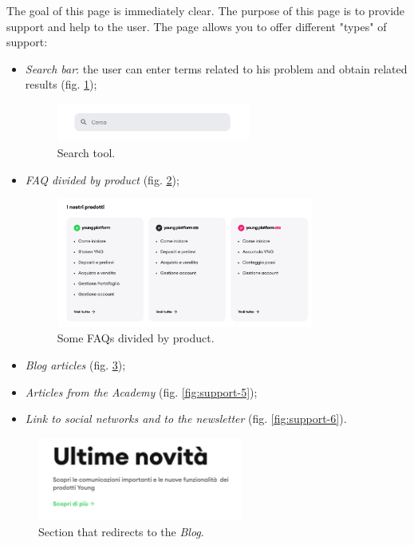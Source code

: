 The goal of this page is immediately clear. The purpose of this page is to 
provide support and help to the user. The page allows you to offer 
different "types" of support:
\begin{itemize}
  \item \textit{Search bar}: the user can enter terms related to his 
  problem and obtain related results (fig. \ref{fig:support-2});

  \begin{figure}[H]
    \centering
    \includegraphics[width=0.60\textwidth]{res/images/internal-pages/support/support-2.png}
    \caption{Search tool.}
    \label{fig:support-2}
  \end{figure}
  
  \item \textit{FAQ divided by product} (fig. \ref{fig:support-3});
  
  \begin{figure}[H]
    \centering
    \includegraphics[width=0.80\textwidth]{res/images/internal-pages/support/support-3.png}
    \caption{Some FAQs divided by product.}
    \label{fig:support-3}
  \end{figure}
  
  \item \textit{Blog articles} (fig. \ref{fig:support-4});
  
  \item \textit{Articles from the Academy} (fig. \ref{fig:support-5});
  
  \item \textit{Link to social networks and to the newsletter} 
  (fig. \ref{fig:support-6}).
\end{itemize}

\begin{figure}[H]
  \centering
  \includegraphics[width=0.60\textwidth]{res/images/internal-pages/support/support-4.png}
  \caption{Section that redirects to the \textit{Blog}.}
  \label{fig:support-4}
\end{figure}

